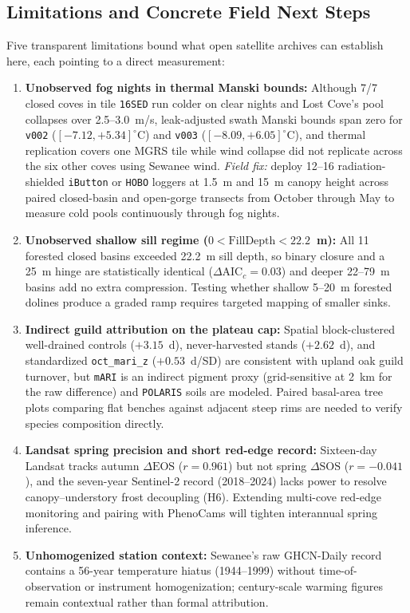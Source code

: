 \subsection{Limitations and Concrete Field Next Steps}
Five transparent limitations bound what open satellite archives can establish here, each pointing to a direct measurement:

\begin{enumerate}[leftmargin=1.5em,itemsep=3pt]
  \item \textbf{Unobserved fog nights in thermal Manski bounds:} Although 7/7 closed coves in tile \texttt{16SED} run colder on clear nights and Lost Cove's pool collapses over 2.5--3.0~m/s, leak-adjusted swath Manski bounds span zero for \texttt{v002} ($[-7.12, +5.34]^\circ$C) and \texttt{v003} ($[-8.09, +6.05]^\circ$C), and thermal replication covers one MGRS tile while wind collapse did not replicate across the six other coves using Sewanee wind. \emph{Field fix:} deploy 12--16 radiation-shielded \texttt{iButton} or \texttt{HOBO} loggers at 1.5~m and 15~m canopy height across paired closed-basin and open-gorge transects from October through May to measure cold pools continuously through fog nights.
  \item \textbf{Unobserved shallow sill regime ($0 < \text{FillDepth} < 22.2$~m):} All 11 forested closed basins exceeded 22.2~m sill depth, so binary closure and a 25~m hinge are statistically identical ($\Delta\text{AIC}_c=0.03$) and deeper 22--79~m basins add no extra compression. Testing whether shallow 5--20~m forested dolines produce a graded ramp requires targeted mapping of smaller sinks.
  \item \textbf{Indirect guild attribution on the plateau cap:} Spatial block-clustered well-drained controls ($+3.15$~d), never-harvested stands ($+2.62$~d), and standardized \texttt{oct\_mari\_z} ($+0.53$~d/SD) are consistent with upland oak guild turnover, but \texttt{mARI} is an indirect pigment proxy (grid-sensitive at 2~km for the raw difference) and \texttt{POLARIS} soils are modeled. Paired basal-area tree plots comparing flat benches against adjacent steep rims are needed to verify species composition directly.
  \item \textbf{Landsat spring precision and short red-edge record:} Sixteen-day Landsat tracks autumn $\Delta\text{EOS}$ ($r=0.961$) but not spring $\Delta\text{SOS}$ ($r=-0.041$), and the seven-year Sentinel-2 record (2018--2024) lacks power to resolve canopy--understory frost decoupling (H6). Extending multi-cove red-edge monitoring and pairing with PhenoCams will tighten interannual spring inference.
  \item \textbf{Unhomogenized station context:} Sewanee's raw GHCN-Daily record contains a 56-year temperature hiatus (1944--1999) without time-of-observation or instrument homogenization; century-scale warming figures remain contextual rather than formal attribution.
\end{enumerate}

